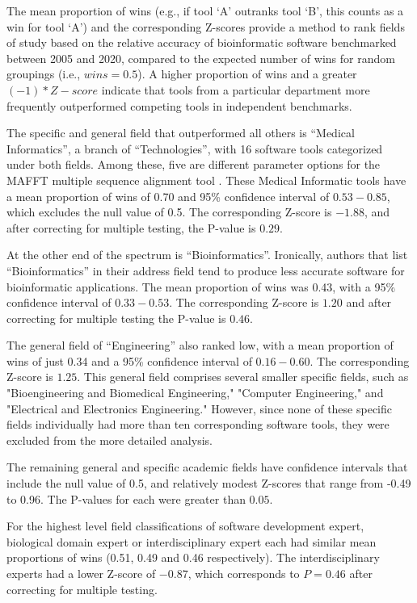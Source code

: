 \documentclass[fleqn,10pt,doc,onecolumn]{SelfArx}%
\begin{document}
The mean proportion of wins (e.g., if tool `A' outranks tool `B', this
counts as a win for tool `A') and the corresponding Z-scores provide a
method to rank fields of study based on the relative accuracy of
bioinformatic software benchmarked between 2005 and 2020, compared to
the expected number of wins for random groupings (i.e., $wins =
0.5$). A higher proportion of wins and a greater $(-1) * Z-score$
indicate that tools from a particular department more frequently
outperformed competing tools in independent benchmarks.

The specific and general field that outperformed all others is
``Medical Informatics'', a branch of ``Technologies'', with 16
software tools categorized under both fields. Among these, five are
different parameter options for the MAFFT multiple sequence alignment
tool \cite{katoh2008recent}.  These Medical Informatic tools have a mean proportion of wins of
0.70 and 95\% confidence interval of $0.53-0.85$, which excludes the
null value of 0.5. The corresponding Z-score is $-1.88$, and after correcting for multiple testing, the P-value is $0.29$.

At the other end of the spectrum is ``Bioinformatics''. Ironically,
authors that list ``Bioinformatics'' in their address field tend to
produce less accurate software for bioinformatic applications. The
mean proportion of wins was 0.43, with a 95\% confidence interval of
$0.33-0.53$. The corresponding Z-score is $1.20$ and after correcting
for multiple testing the P-value is $0.46$.


The general field of ``Engineering'' also ranked low, with a mean
proportion of wins of just 0.34 and a 95\% confidence interval of
$0.16-0.60$. The corresponding Z-score is $1.25$. This general field
comprises several smaller specific fields, such as "Bioengineering and
Biomedical Engineering," "Computer Engineering," and "Electrical and
Electronics Engineering." However, since none of these specific fields
individually had more than ten corresponding software tools, they were
excluded from the more detailed analysis.

The remaining general and specific academic fields have confidence
intervals that include the null value of 0.5, and relatively modest
Z-scores that range from -0.49 to 0.96. The P-values for each were
greater than $0.05$. 

For the highest level field classifications of software development
expert, biological domain expert or interdisciplinary expert each had
similar mean proportions of wins (0.51, 0.49 and 0.46
respectively). The interdisciplinary experts had a lower Z-score of
$-0.87$, which corresponds to $P=0.46$ after correcting for multiple
testing.
\end{document}
